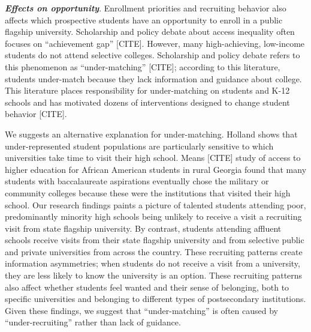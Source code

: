 \documentclass[twoside]{article}
\begin{document}
\textbf{\textit{Effects on opportunity}}.  Enrollment priorities and recruiting behavior also affects which prospective students have an opportunity to enroll in a public flagship university.  Scholarship and policy debate about access inequality often focuses on ``achievement gap'' [CITE].  However, many high-achieving, low-income students do not attend selective colleges.  Scholarship and policy debate refers to this phenomenon as “under-matching” [CITE]; according to this literature, students under-match because they lack information and guidance about college. This literature places responsibility for under-matching on students and K-12 schools and has motivated dozens of interventions designed to change student behavior [CITE].

We suggests an alternative explanation for under-matching. Holland \citeyear{RN4324} shows that under-represented student populations are particularly sensitive to which universities take time to visit their high school. Means [CITE] study of access to higher education for African American students in rural Georgia found that many students with baccalaureate aspirations eventually chose the military or community colleges because these were the institutions that visited their high school. Our research findings paints a picture of talented students attending poor, predominantly minority high schools being unlikely to receive a visit a recruiting visit from state flagship university. By contrast, students attending affluent schools receive visits from their state flagship university and from selective public and private universities from across the country.  These recruiting patterns create information asymmetries; when students do not receive a visit from a university, they are less likely to know the university is an option. These recruiting patterns also affect whether students feel wanted and their sense of belonging, both to specific universities and belonging to different types of postsecondary institutions.  Given these findings, we suggest that ``under-matching'' is often caused by ``under-recruiting'' rather than lack of guidance.

\end{document}
